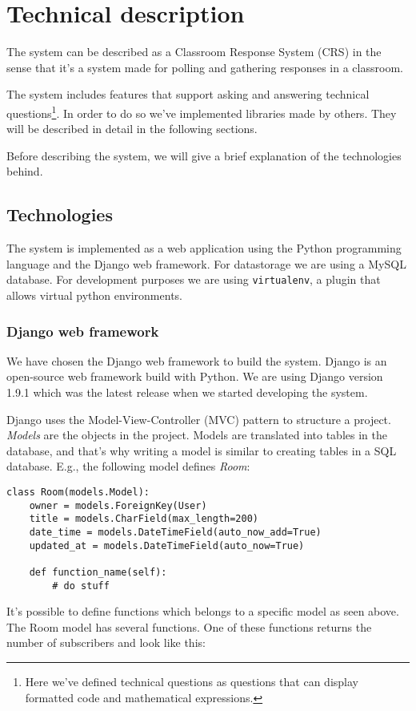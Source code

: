 \section{Technical description}
The system can be described as a Classroom Response System (CRS) in the sense that it's a system made for polling and gathering responses in a classroom.

The system includes features that support asking and answering technical questions\footnote{Here we've defined technical questions as questions that can display formatted code and mathematical expressions.}. In order to do so we've implemented libraries made by others. They will be described in detail in the following sections.

Before describing the system, we will give a brief explanation of the technologies behind.

\subsection{Technologies}

The system is implemented as a web application using the Python programming language and the Django web framework. For datastorage we are using a MySQL database.
For development purposes we are using \texttt{virtualenv}, a plugin that allows virtual python environments.

\subsubsection{Django web framework}
We have chosen the Django web framework to build the system. Django is an open-source web framework build with Python. We are using Django version 1.9.1 which was the latest release when we started developing the system.

Django uses the Model-View-Controller (MVC) pattern to structure a project. \emph{Models} are the objects in the project. Models are translated into tables in the database, and that's why writing a model is similar to creating tables in a SQL database. E.g., the following model defines \emph{Room}: 
\begin{verbatim}
class Room(models.Model):
    owner = models.ForeignKey(User)
    title = models.CharField(max_length=200)
    date_time = models.DateTimeField(auto_now_add=True)
    updated_at = models.DateTimeField(auto_now=True)
    
    def function_name(self):
        # do stuff
\end{verbatim}
It's possible to define functions which belongs to a specific model as seen above. The Room model has several functions. One of these functions returns the number of subscribers and look like this:

